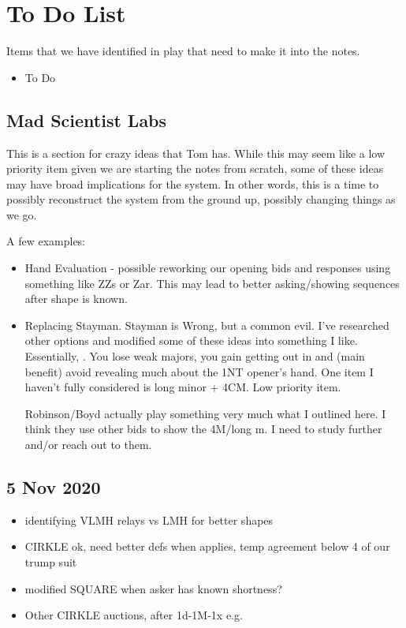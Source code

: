 \documentclass[tom-ari]{subfile}
\begin{document}
	
	\chapter{To Do List}
	
	Items that we have identified in play that need to make it into the notes.
	\begin{itemize}
		\item To Do
	\end{itemize}

	\section{Mad Scientist Labs}
	
	This is a section for crazy ideas that Tom has.  While this may seem like a low priority item given we are starting the notes from scratch, some of these ideas may have broad implications for the system.  In other words, this is a time to possibly reconstruct the system from the ground up, possibly changing things as we go.
	
	A few examples:
	
	\begin{itemize}
		\item Hand Evaluation - possible reworking our opening bids and responses using something like ZZs or Zar.  This may lead to better asking/showing sequences after shape is known.
		\item Replacing Stayman.  Stayman is Wrong, but a common evil.  I've researched other options and modified some of these ideas into something I like.  Essentially, \rightarrow{}.  You lose weak majors, you gain getting out in  and (main benefit) avoid revealing much about the 1NT opener's hand.  One item I haven't fully considered is long minor + 4CM.  Low priority item.
		
		 Robinson/Boyd actually play something very much what I outlined here.  I think they use other bids to show the 4M/long m.  I need to study further and/or reach out to them.
	\end{itemize}

	\section{5 Nov 2020}
	\begin{itemize}
		\item identifying VLMH relays vs LMH for better shapes
		\item CIRKLE ok, need better defs when applies, temp agreement below 4 of our trump suit
		\item modified SQUARE when asker has known shortness? 
		\item Other CIRKLE auctions, after 1d-1M-1x e.g.
	\end{itemize}
\end{document}
